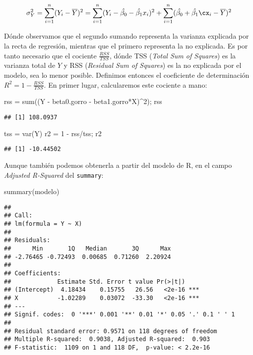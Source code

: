 \documentclass[
]{article}
\newenvironment{Shaded}{\begin{snugshade}}{\end{snugshade}}
\newcommand{\DecValTok}[1]{\textcolor[rgb]{0.00,0.00,0.81}{#1}}
\newcommand{\FunctionTok}[1]{\textcolor[rgb]{0.00,0.00,0.00}{#1}}
\newcommand{\NormalTok}[1]{#1}
\newcommand{\OtherTok}[1]{\textcolor[rgb]{0.56,0.35,0.01}{#1}}
\newcommand{\SpecialCharTok}[1]{\textcolor[rgb]{0.00,0.00,0.00}{#1}}
\begin{document}
\[
\sigma_Y^2 = 
\sum_{i=1}^n (Y_i - \overline{Y})^2 = 
\sum_{i=1}^n (Y_i - \hat{\beta_0} - \hat{\beta_1}x_i)^2 + 
\sum_{i=1}^n (\hat{\beta_0} + \hat{\beta_1}\cx_i - \overline{Y})^2
\]

Dónde observamos que el segundo sumando representa la varianza explicada
por la recta de regresión, mientras que el primero representa la no
explicada. Es por tanto necesario que el cociente \(\frac{RSS}{TSS}\),
dónde TSS (\textit{Total Sum of Squares}) es la varianza total de \(Y\)
y RSS (\textit{Residual Sum of Squares}) es la no explicada por el
modelo, sea lo menor posible. Definimos entonces el coeficiente de
determinación \(R^2 = 1 - \frac{RSS}{TSS}\). En primer lugar,
calcularemos este cociente a mano:

\begin{Shaded}
\begin{Highlighting}[]
\NormalTok{rss }\OtherTok{=} \FunctionTok{sum}\NormalTok{((Y }\SpecialCharTok{{-}}\NormalTok{ beta0.gorro }\SpecialCharTok{{-}}\NormalTok{ beta1.gorro}\SpecialCharTok{*}\NormalTok{X)}\SpecialCharTok{\^{}}\DecValTok{2}\NormalTok{); rss}
\end{Highlighting}
\end{Shaded}

\begin{verbatim}
## [1] 108.0937
\end{verbatim}

\begin{Shaded}
\begin{Highlighting}[]
\NormalTok{tss }\OtherTok{=} \FunctionTok{var}\NormalTok{(Y)}
\NormalTok{r2 }\OtherTok{=} \DecValTok{1} \SpecialCharTok{{-}}\NormalTok{ rss}\SpecialCharTok{/}\NormalTok{tss; r2}
\end{Highlighting}
\end{Shaded}

\begin{verbatim}
## [1] -10.44502
\end{verbatim}

Aunque también podemos obtenerla a partir del modelo de R, en el campo
\textit{Adjusted R-Squared} del \texttt{summary}:

\begin{Shaded}
\begin{Highlighting}[]
\FunctionTok{summary}\NormalTok{(modelo)}
\end{Highlighting}
\end{Shaded}

\begin{verbatim}
## 
## Call:
## lm(formula = Y ~ X)
## 
## Residuals:
##      Min       1Q   Median       3Q      Max 
## -2.76465 -0.72493  0.00685  0.71260  2.20924 
## 
## Coefficients:
##             Estimate Std. Error t value Pr(>|t|)    
## (Intercept)  4.18434    0.15755   26.56   <2e-16 ***
## X           -1.02289    0.03072  -33.30   <2e-16 ***
## ---
## Signif. codes:  0 '***' 0.001 '**' 0.01 '*' 0.05 '.' 0.1 ' ' 1
## 
## Residual standard error: 0.9571 on 118 degrees of freedom
## Multiple R-squared:  0.9038, Adjusted R-squared:  0.903 
## F-statistic:  1109 on 1 and 118 DF,  p-value: < 2.2e-16
\end{verbatim}
\end{document}
